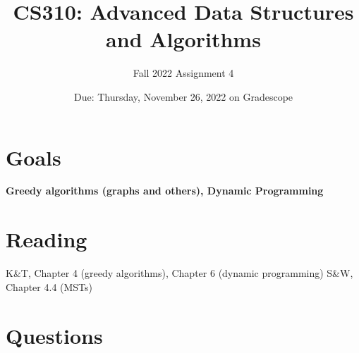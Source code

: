 \documentclass[letterpaper, 11pt]{article}
\title{CS310: Advanced Data Structures and Algorithms}
\author{Fall 2022 Assignment 4}
\date{Due: Thursday, November 26, 2022 on Gradescope}
\begin{document}
\maketitle

\section*{Goals}
\vspace{-0.5em}
\textbf{Greedy algorithms (graphs and others), Dynamic Programming}

\section*{Reading}
\vspace{-0.5em}
K\&T, Chapter 4 (greedy algorithms), Chapter 6 (dynamic programming) S\&W, Chapter 4.4 (MSTs)

\section*{Questions}
\end{document}
